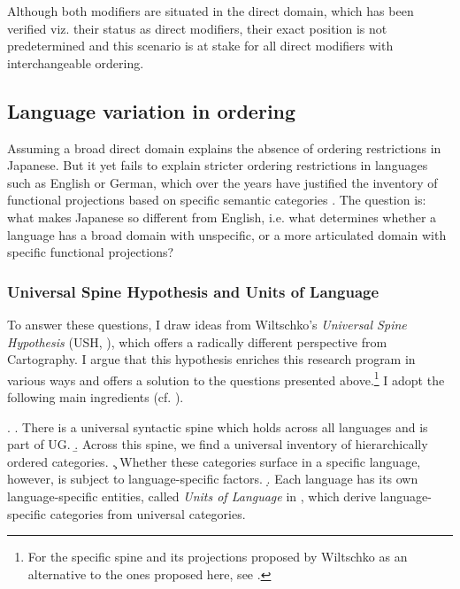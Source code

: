 Although both modifiers are situated in the direct domain, which has been verified viz. their status as direct modifiers, their exact position is not predetermined and this scenario is at stake for all direct modifiers with interchangeable ordering.

\subsection{Language variation in ordering} \label{language variation}

Assuming a broad direct domain explains the absence of ordering restrictions in Japanese. But it yet fails to explain stricter ordering restrictions in languages such as  English or  German, which over the years have justified the inventory of functional projections based on specific semantic categories \citep{cinque:2010:adj, cinque:2025:superiority, laenzlinger:2011:elements}. The question is: what makes Japanese so different from English, i.e. what determines whether a language has a broad domain with unspecific, or a more articulated domain with specific functional projections?

\subsubsection{Universal Spine Hypothesis and Units of Language} \label{units of language} 

To answer these questions, I draw ideas from Wiltschko's \textit{Universal Spine Hypothesis} (USH, \citealt[24–26]{wiltschko:2014:universal}), which offers a radically different perspective from Cartography. I argue that this hypothesis enriches this research program in various ways and offers a solution to the questions presented above.\footnote{For the specific spine and its projections proposed by Wiltschko as an alternative to the ones proposed here, see \citet[§ 2]{wiltschko:2014:universal}.} I adopt the following main ingredients (cf. \citealt[§ 1, 2]{wiltschko:2014:universal}).  

\newpage
\ex. \a. There is a universal syntactic spine which holds across all languages and is part of UG.
\b. Across this spine, we find a universal inventory of hierarchically ordered categories.
\c. Whether these categories surface in a specific language, however, is subject to language-specific factors.
\d. Each language has its own language-specific entities, called \textit{Units of Language} in \citet[1]{wiltschko:2014:universal}, which derive language-specific categories from universal categories.

